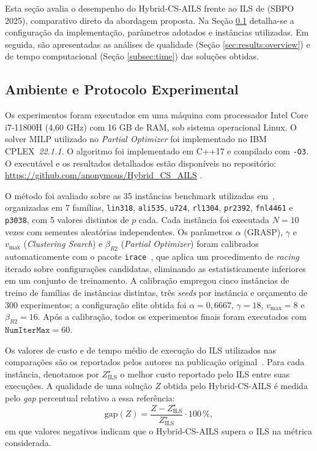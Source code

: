 \documentclass[a4paper,11pt]{article}
\begin{document}
Esta seção avalia o desempenho do Hybrid-CS-AILS frente ao ILS de \cite{freitas2025ils_pmediana} (SBPO 2025), comparativo direto da abordagem proposta.  Na Seção \ref{subsec:implement_inst} detalha-se a configuração da implementação, parâmetros adotados e instâncias utilizadas. Em seguida, são apresentadas as análises de qualidade (Seção \ref{sec:results:overview}) e de tempo computacional (Seção \ref{subsec:time}) das soluções obtidas.

\subsection{Ambiente e Protocolo Experimental}
\label{subsec:implement_inst}

Os experimentos foram executados em uma máquina com processador Intel Core i7-11800H (4,60 GHz) com 16 GB de RAM, sob sistema operacional Linux. O solver MILP utilizado no \emph{Partial Optimizer} foi implementado no \textsc{IBM CPLEX}~\textit{22.1.1}. O algoritmo foi implementado em C++17 e compilado com \texttt{-O3}. O executável e os resultados detalhados estão disponíveis no repositório: \url{https://github.com/anonymous/Hybrid_CS_AILS} .

O método foi avaliado sobre as 35 instâncias benchmark utilizadas em~\cite{stefanello2015matheuristics}, organizadas em 7 famílias, \texttt{lin318}, \texttt{ali535}, \texttt{u724}, \texttt{rl1304},
\texttt{pr2392}, \texttt{fnl4461} e \texttt{p3038}, com 5 valores
distintos de $p$ cada. Cada instância foi executada $N=10$ vezes com sementes aleatórias independentes. Os parâmetros $\alpha$ (GRASP), $\gamma$ e $v_{\max}$ (\textit{Clustering Search}) e $\beta_{R2}$ (\textit{Partial Optimizer}) foram calibrados automaticamente com o pacote \texttt{irace}~\cite{LopezIbanez2016irace}, que aplica um procedimento de \textit{racing} iterado sobre configurações candidatas, eliminando as estatisticamente inferiores em um conjunto de treinamento. A calibração empregou cinco instâncias de treino de famílias de instâncias distintas, três \textit{seeds} por instância e orçamento de 300 experimentos; a configuração elite obtida foi $\alpha = 0{,}6667$, $\gamma = 18$, $v_{\max} = 8$ e $\beta_{R2} = 16$. Após a calibração, todos os experimentos finais foram executados com $\texttt{NumIterMax}=60$. 


Os valores de custo e de tempo médio de execução do ILS utilizados nas
comparações são os reportados pelos autores na publicação
original~\cite{freitas2025ils_pmediana}. Para cada instância, denotamos por $Z^{\star}_{\mathrm{ILS}}$
o melhor custo reportado pelo ILS entre suas execuções. A qualidade de
uma solução $Z$ obtida pelo Hybrid-CS-AILS é medida pelo \emph{gap}
percentual relativo a essa referência:
\begin{equation}
  \mathrm{gap}(Z) = \frac{Z - Z^{\star}_{\mathrm{ILS}}}{Z^{\star}_{\mathrm{ILS}}} \cdot 100\,\%,
  \label{eq:gap}
\end{equation}
em que valores negativos indicam que o Hybrid-CS-AILS supera o ILS na
métrica considerada.
\end{document}
